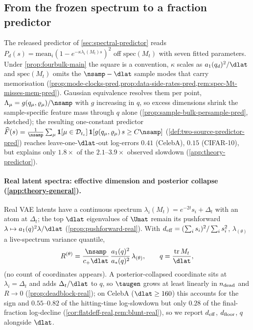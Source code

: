 \subsection{From the frozen spectrum to a fraction predictor}
\label{sec:theory-predictor}

The released predictor of \cref{sec:spectral-predictor} reads $P_d(s)=\mathrm{mean}_i(1-e^{-\kappa\lambda_i(M_t)s})^2$ off $\mathrm{spec}(M_t)$ with seven fitted parameters. Under \cref{prop:fourbulk-main} the square is a convention, $\kappa$ scales as $a_1(q_d)^2/\dlat$ and $\mathrm{spec}(M_t)$ omits the $\nsamp-\dlat$ sample modes that carry memorisation (\cref{prop:mode-clocks-pred,prop:data-side-rates-pred,rem:spec-Mt-misses-mem-pred}). Gaussian equivalence resolves them per point, $\Lambda_\mu=g(q_\mu,\varrho_\mu)/\nsamp$ with $g$ increasing in $q$, so excess dimensions shrink the sample-specific feature mass through $q$ alone (\cref{prop:sample-bulk-persample-pred}, sketched); the resulting one-constant predictor $\widehat F(s)=\tfrac1\nsamp\sum_\mu\mathbf 1[\mu\in\mathcal D_{t_c}]\,\mathbf 1[g(q_\mu,\varrho_\mu)\,s\ge C\nsamp]$ (\cref{def:two-source-predictor-pred}) reaches leave-one-$\dlat$-out log-errors $0.41$ (CelebA), $0.15$ (CIFAR-10), but explains only $1.8\times$ of the $2.1$--$3.9\times$ observed slowdown (\cref{app:theory-predictor}).

\paragraph{Real latent spectra: effective dimension and posterior collapse (\cref{app:theory-general}).}\label{sec:theory-real}
Real VAE latents have a continuous spectrum $\lambda_i(M_t)=e^{-2t}s_i+\Delta_t$ with an atom at $\Delta_t$; the top $\dlat$ eigenvalues of $\Umat$ remain its pushforward $\lambda\mapsto a_1(q)^2\lambda/\dlat$ (\cref{prop:pushforward-real}). With $d_{\rm eff}=(\sum_is_i)^2/\sum_is_i^2$, $\lambda_{(\theta)}$ a live-spectrum variance quantile,
\begin{equation}\label{eq:ratio-real-main}
R^{(\theta)}=\frac{\nsamp}{c_+\dlat}\,\frac{a_1(q)^2}{a_*(q)^2}\,\lambda_{(\theta)},\qquad q=\frac{\operatorname{tr}M_t}{\dlat},
\end{equation}
(no count of coordinates appears). A posterior-collapsed coordinate sits at $\lambda_i=\Delta_t$ and adds $\Delta_t/\dlat$ to $q$, so $\taugen$ grows at least linearly in $n_{\rm dead}$ and $R\to0$ (\cref{prop:deadblock-real}); on CelebA ($\dlat\ge160$) this accounts for the sign and $0.55$--$0.82$ of the hitting-time log-slowdown but only $0.28$ of the final-fraction log-decline (\cref{cor:flatdeff-real,rem:blunt-real}), so we report $d_{\rm eff}$, $d_{\rm floor}$, $q$ alongside $\dlat$.

